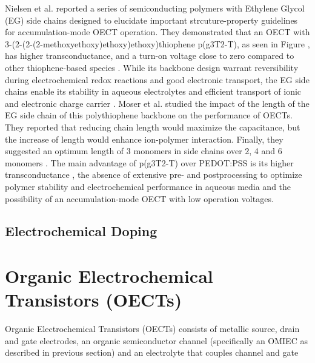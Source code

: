 Nielsen et al. reported a series of semiconducting polymers with Ethylene Glycol (EG) side chains designed to elucidate important strcuture-property guidelines for accumulation-mode OECT operation. They demonstrated that an OECT with 3-(2-(2-(2-methoxyethoxy)ethoxy)ethoxy)thiophene p(g3T2-T), as seen in Figure , has higher transconductance, and a turn-on voltage close to zero compared to other thiophene-based species \cite{nielsenMolecularDesignSemiconducting2016}. While its backbone design warrant reversibility during electrochemical redox reactions and good electronic transport, the EG side chains enable its stability in aqueous electrolytes and efficient transport of ionic and electronic charge carrier \cite{moiaDesignEvaluationConjugated2019}. Moser et al. studied the impact of the length of the EG side chain of this polythiophene backbone on the performance of OECTs. They reported that reducing chain length would maximize the capacitance, but the increase of length would enhance ion-polymer interaction. Finally, they suggested an optimum length of 3 monomers in side chains over 2, 4 and 6 monomers \cite{moserEthyleneGlycolBasedSide2020}. The main advantage of p(g3T2-T) over PEDOT:PSS is its higher transconductance \cite{nielsenMolecularDesignSemiconducting2016}, the absence of extensive pre- and postprocessing to optimize polymer stability and electrochemical performance in aqueous media and the possibility of an accumulation-mode OECT with low operation voltages\cite{moserEthyleneGlycolBasedSide2020}.

\subsection{Electrochemical Doping}


\section{Organic Electrochemical Transistors (OECTs)}

Organic Electrochemical Transistors (OECTs) consists of metallic source, drain and gate electrodes, an organic semiconductor channel (specifically an OMIEC as described in previous section) and an electrolyte that couples channel and gate \cite{rivnayOrganicElectrochemicalTransistors2018}

